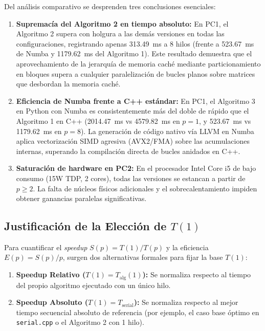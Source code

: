 Del análisis comparativo se desprenden tres conclusiones esenciales:
\begin{enumerate}
    \item \textbf{Supremacía del Algoritmo 2 en tiempo absoluto:} En PC1, el Algoritmo 2 supera con holgura a las demás versiones en todas las configuraciones, registrando apenas \SI{313.49}{\milli\second} a 8 hilos (frente a \SI{523.67}{\milli\second} de Numba y \SI{1179.62}{\milli\second} del Algoritmo 1). Este resultado demuestra que el aprovechamiento de la jerarquía de memoria caché mediante particionamiento en bloques supera a cualquier paralelización de bucles planos sobre matrices que desbordan la memoria caché.
    \item \textbf{Eficiencia de Numba frente a C++ estándar:} En PC1, el Algoritmo 3 en Python con Numba es consistentemente más del doble de rápido que el Algoritmo 1 en C++ (\SI{2014.47}{\milli\second} vs \SI{4579.82}{\milli\second} en $p=1$, y \SI{523.67}{\milli\second} vs \SI{1179.62}{\milli\second} en $p=8$). La generación de código nativo vía LLVM en Numba aplica vectorización SIMD agresiva (AVX2/FMA) sobre las acumulaciones internas, superando la compilación directa de bucles anidados en C++.
    \item \textbf{Saturación de hardware en PC2:} En el procesador Intel Core i5 de bajo consumo (15W TDP, 2 cores), todas las versiones se estancan a partir de $p \ge 2$. La falta de núcleos físicos adicionales y el sobrecalentamiento impiden obtener ganancias paralelas significativas.
\end{enumerate}

\subsection{Justificación de la Elección de $T(1)$}
Para cuantificar el \emph{speedup} $S(p) = T(1)/T(p)$ y la eficiencia $E(p) = S(p)/p$, surgen dos alternativas formales para fijar la base $T(1)$:
\begin{enumerate}
    \item \textbf{Speedup Relativo ($T(1) = T_{\text{alg}}(1)$):} Se normaliza respecto al tiempo del propio algoritmo ejecutado con un único hilo.
    \item \textbf{Speedup Absoluto ($T(1) = T_{\text{serial}}$):} Se normaliza respecto al mejor tiempo secuencial absoluto de referencia (por ejemplo, el caso base óptimo en \texttt{serial.cpp} o el Algoritmo 2 con 1 hilo).
\end{enumerate}

